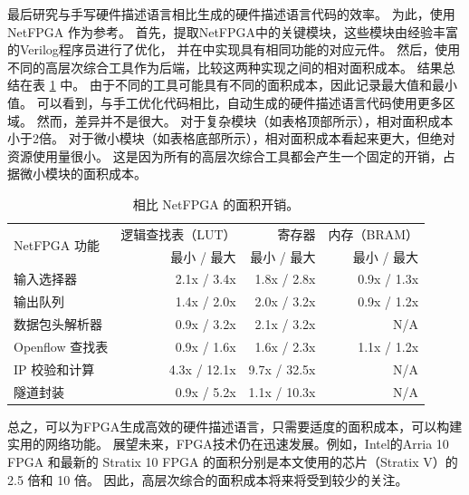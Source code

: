 最后研究\name 与手写硬件描述语言相比生成的硬件描述语言代码的效率。
为此，使用NetFPGA \cite {netfpga}作为参考。
首先，提取NetFPGA中的关键模块，这些模块由经验丰富的Verilog程序员进行了优化，
并在\name 中实现具有相同功能的对应元件。
然后，使用不同的高层次综合工具作为后端，比较这两种实现之间的相对面积成本。
结果总结在表 \ref {clicknp:tab:netfpga} 中。
由于不同的工具可能具有不同的面积成本，因此记录最大值和最小值。
可以看到，与手工优化代码相比，自动生成的硬件描述语言代码使用更多区域。
然而，差异并不是很大。
对于复杂模块（如表格顶部所示），相对面积成本小于2倍。
对于微小模块（如表格底部所示），相对面积成本看起来更大，但绝对资源使用量很小。
这是因为所有的高层次综合工具都会产生一个固定的开销，占据微小模块的面积成本。


\begin{table}[htbp]
	\centering
	\caption{相比 NetFPGA 的面积开销。}
	\label{clicknp:tab:netfpga}
	\small
		\begin{tabular}{l|r|r|r}
			\toprule
			\multirow{2}{2.2cm}{NetFPGA 功能} & 逻辑查找表（LUT） & 寄存器 & 内存（BRAM） \\
			& 最小 / 最大 & 最小 / 最大 & 最小 / 最大 \\
			\midrule
			输入选择器  & 2.1x / 3.4x & 1.8x / 2.8x & 0.9x / 1.3x \\
			输出队列   & 1.4x / 2.0x & 2.0x / 3.2x & 0.9x / 1.2x \\
			数据包头解析器  & 0.9x / 3.2x & 2.1x / 3.2x & N/A \\
			Openflow 查找表 & 0.9x / 1.6x & 1.6x / 2.3x & 1.1x / 1.2x \\
			\midrule
			\midrule
			IP 校验和计算    & 4.3x / 12.1x & 9.7x / 32.5x & N/A \\
			隧道封装          & 0.9x / 5.2x & 1.1x / 10.3x & N/A \\
			\bottomrule
		\end{tabular}
\end{table}

总之，\name 可以为FPGA生成高效的硬件描述语言，只需要适度的面积成本，可以构建实用的网络功能。
展望未来，FPGA技术仍在迅速发展。例如，Intel的Arria 10 FPGA 和最新的 Stratix 10 FPGA 的面积分别是本文使用的芯片（Stratix V）的 2.5 倍和 10 倍。
因此，高层次综合的面积成本将来将受到较少的关注。






